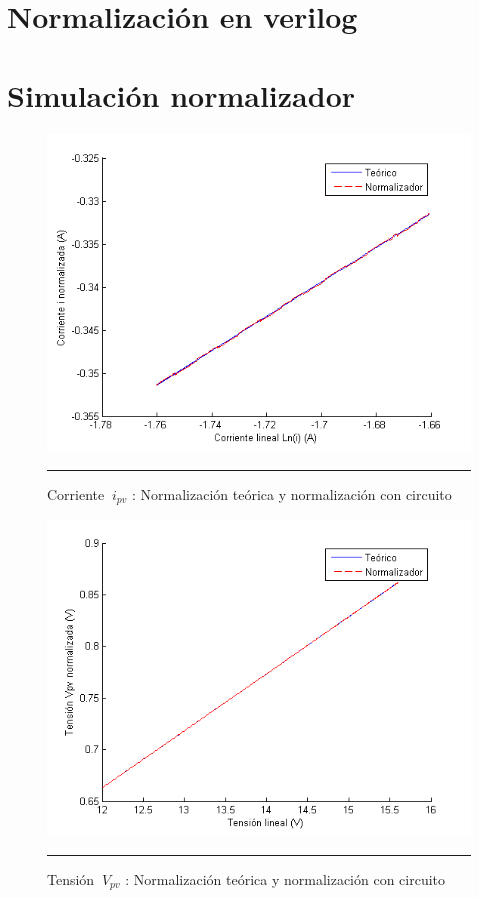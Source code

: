 \section{Normalización en verilog}


\section{Simulación normalizador}

  \begin{figure}[H]
  \centering
    \includegraphics[scale=0.7]{./Normalizador_I.png}
    \rule{35em}{0.5pt}
  \caption[Normalizador de corriente]{Corriente $\ i_{pv}$ : Normalización teórica y normalización con circuito}
  \label{fig:NORMI}
\end{figure}

  \begin{figure}[H]
  \centering
    \includegraphics[scale=0.7]{./Normalizador_V.png}
    \rule{35em}{0.5pt}
  \caption[Normalizador de tensión]{Tensión $\ V_{pv}$ : Normalización teórica y normalización con circuito}
  \label{fig:NORMV}
\end{figure}
